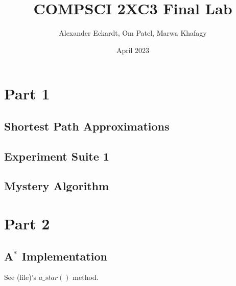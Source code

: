 \documentclass{article}
\title{COMPSCI 2XC3 Final Lab}
\author{Alexander Eckardt, Om Patel, Marwa Khafagy}
\date{April 2023}
\begin{document}
\maketitle
\newpage

\tableofcontents
\newpage

\listoffigures
\newpage


\section{Part 1}
\subsection{Shortest Path Approximations}
\subsection{Experiment Suite 1}
\subsection{Mystery Algorithm}

\newpage
\section{Part 2}
\subsection{A$^{*}$ Implementation}
    See (file)'s $a\_star()$ method.
    
\end{document}
